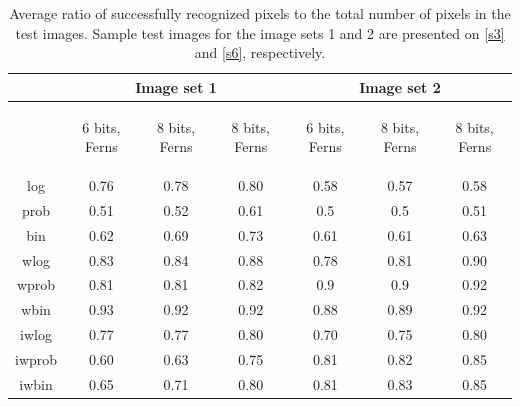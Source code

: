 \begin{table}

\begin{tabular}{|c||c|c|c||c|c|c|}

                                                                            \hline
  {}  &  \multicolumn{3}{|c||}{Image set 1}  &\multicolumn{3}{|c|}{Image set 2}    \\\hline
    {}  & {\parbox[c][2.5em]{0.13\linewidth}{\centering\begin{spacing}{0.7} 6 bits,  Ferns\end{spacing}}} & {\parbox[c][2em]{0.13\linewidth}{\centering\begin{spacing}{0.7} 8 bits,  Ferns\end{spacing}}}& {\parbox[c][2em]{0.13\linewidth}{\centering\begin{spacing}{0.7} 8 bits,  Ferns \end{spacing}}} &{\parbox[c][2em]{0.13\linewidth}{\centering\begin{spacing}{0.7} 6 bits,  Ferns\end{spacing}}}  &{\parbox[c][2em]{0.13\linewidth}{\centering\begin{spacing}{0.7} 8 bits,  Ferns\end{spacing}}}&{\parbox[c][2em]{0.13\linewidth}{\centering\begin{spacing}{0.7} 8 bits,   Ferns\end{spacing}}} \\\hline

 {log}  & {0.76} & {0.78}& {0.80} &{0.58}  &{0.57}&{0.58} \\\hline
 {prob}  & {0.51} & {0.52}& {0.61} &{0.5}  &{0.5}&{0.51} \\\hline
 {bin}  & {0.62} & {0.69}& {0.73} &{0.61}  &{0.61}&{0.63} \\\hline

  {wlog}  & {0.83} & {0.84}& {0.88} &{0.78}  &{0.81}&{0.90} \\\hline
 {wprob}  & {0.81} & {0.81}& {0.82} &{0.9}  &{0.9}&{0.92} \\\hline
 {wbin}  & {0.93} & {0.92}& {0.92} &{0.88}  &{0.89}&{0.92} \\\hline


{iwlog}  & {0.77} & {0.77}& {0.80} &{0.70}  &{0.75}&{0.80} \\\hline
 {iwprob}  & {0.60} & {0.63}& {0.75} &{0.81}  &{0.82}&{0.85} \\\hline
 {iwbin}  & {0.65} & {0.71}& {0.80} &{0.81}  &{0.83}&{0.85} \\\hline

\end{tabular}

\caption{Average ratio of successfully recognized pixels to the total number of pixels in the test images. Sample test images for the image sets 1 and 2 are presented on \ref{s3} and \ref{s6}, respectively.}
\label{tbl1}
\end{table}

